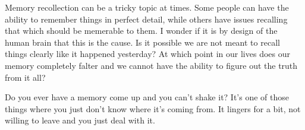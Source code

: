 Memory recollection can be a tricky topic at times. Some people can have the ability
to remember things in perfect detail, while others have issues recalling that which
should be memerable to them. I wonder if it is by design of the human brain that this
is the cause. Is it possible we are not meant to recall things clearly like it
happened yesterday? At which point in our lives does our memory completely falter and
we cannot have the ability to figure out the truth from it all?

Do you ever have a memory come up and you can't shake it? It's one of those things
where you just don't know where it's coming from. It lingers for a bit, not willing
to leave and you just deal with it.
